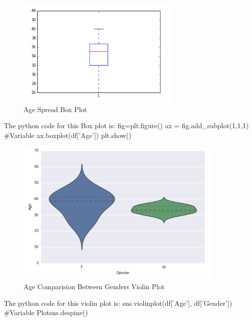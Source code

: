 \documentclass[sigconf]{acmart}
\begin{document}
\begin{figure}[htb]
  \centering
  \includegraphics[width=1.0\columnwidth]{paper2/Graph 2.png}
  \caption{Age Spread Box Plot
  \cite{Sunil Ray }}
  \label{fig:Graph 2} 
\end{figure}

The python code for this Box plot is:
fig=plt.figure()
ax = fig.add_subplot(1,1,1)
#Variable
ax.boxplot(df['Age'])
plt.show()

\begin{figure}[htb]
  \centering
  \includegraphics[width=1.0\columnwidth]{paper2/Graph 3.png}
  \caption{Age Comparision Between Genders Violin Plot
  \cite{Sunil Ray }}
  \label{fig:Graph 3} 
\end{figure}

The python code for this violin plot is:
sns.violinplot(df['Age'], df['Gender']) #Variable Plotsns.despine()
\end{document}

